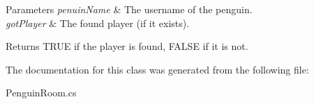 \begin{DoxyParams}{Parameters}
{\em penuin\-Name} & The username of the penguin.\\
\hline
{\em got\-Player} & The found player (if it exists).\\
\hline
\end{DoxyParams}
\begin{DoxyReturn}{Returns}
T\-R\-U\-E if the player is found, F\-A\-L\-S\-E if it is not. 
\end{DoxyReturn}


The documentation for this class was generated from the following file\-:\begin{DoxyCompactItemize}
\item 
Penguin\-Room.\-cs\end{DoxyCompactItemize}
